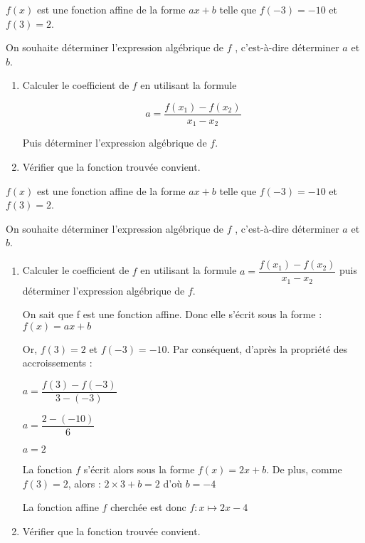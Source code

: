 \begin{exercice*}
    $f(x)$ est une fonction affine de la forme $ax+b$ telle que $f(-3)=-10$ et $f(3)=2$.

    On souhaite déterminer l'expression algébrique de $f$ , c'est-à-dire déterminer $a$ et $b$.
    \begin{enumerate}
        \item Calculer le coefficient de $f$ en utilisant la formule 
        
        $$a=\dfrac{f(x_1)-f(x_2)}{x_1-x_2}$$
        
        Puis déterminer l'expression algébrique de $f$.
        \item Vérifier que la fonction trouvée convient.
    \end{enumerate}
\end{exercice*}
\begin{corrige}
    $f(x)$ est une fonction affine de la forme $ax+b$ telle que $f(-3)=-10$ et $f(3)=2$.

    On souhaite déterminer l'expression algébrique de $f$ , c'est-à-dire déterminer $a$ et $b$.
    
    \begin{enumerate}
        \item Calculer le coefficient de $f$ en utilisant la formule $a=\dfrac{f(x_1)-f(x_2)}{x_1-x_2}$ puis déterminer l'expression algébrique de $f$.
        
        {\color{red} 
        On sait que f est une fonction affine. Donc elle s’écrit sous la forme : $f (x) = ax + b$
        
        Or, $f (3) = 2$ et $f (-3) = -10$. Par conséquent, d’après la propriété des accroissements :

        $a=\dfrac{f(3)-f(-3)}{3-(-3)}$

        $a=\dfrac{2-(-10)}{6}$

        $a=2$

        La fonction $f$ s’écrit alors sous la forme $f (x) = 2x + b$.
        De plus, comme $f (3) = 2$, alors : $2\times 3+b = 2$ d'où $b=-4$

        La fonction affine $f$ cherchée est donc $f : x \longmapsto 2x - 4$
        
        }
    \end{enumerate}
    \Coupe
    \begin{enumerate}
        \setcounter{enumi}{1}
        \item Vérifier que la fonction trouvée convient.        
        {\color{red}%
        }
    \end{enumerate}
\end{corrige}

